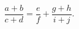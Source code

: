 \documentclass[a4paper]{article}
\title{}
\begin{document}
	\maketitle
	\[
	\frac{a+b}{c+d}= \frac{e}{f}+ \frac{g+h}{i+j}
	.\] 
\end{document}
